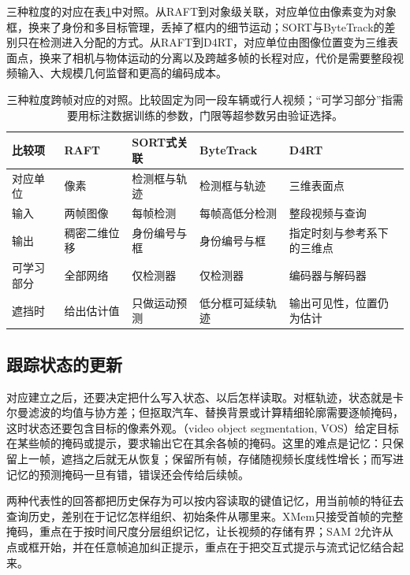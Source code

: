 三种粒度的对应在表\ref{tab:vision-video-correspondence-compare}中对照。从RAFT到对象级关联，对应单位由像素变为对象框，换来了身份和多目标管理，丢掉了框内的细节运动；SORT与ByteTrack的差别只在检测进入分配的方式。从RAFT到D4RT，对应单位由图像位置变为三维表面点，换来了相机与物体运动的分离以及跨越多帧的长程对应，代价是需要整段视频输入、大规模几何监督和更高的编码成本。

\begin{table}[htbp]
  \centering
  \small
  \begin{tabularx}{\linewidth}{@{}lXXXX@{}}
    \toprule
    比较项 & RAFT & SORT式关联 & ByteTrack & D4RT\\
    \midrule
    对应单位 & 像素 & 检测框与轨迹 & 检测框与轨迹 & 三维表面点\\
    输入 & 两帧图像 & 每帧检测 & 每帧高低分检测 & 整段视频与查询\\
    输出 & 稠密二维位移 & 身份编号与框 & 身份编号与框 & 指定时刻与参考系下的三维点\\
    可学习部分 & 全部网络 & 仅检测器 & 仅检测器 & 编码器与解码器\\
    遮挡时 & 给出估计值 & 只做运动预测 & 低分框可延续轨迹 & 输出可见性，位置仍为估计\\
    \bottomrule
  \end{tabularx}
  \caption{三种粒度跨帧对应的对照。比较固定为同一段车辆或行人视频；“可学习部分”指需要用标注数据训练的参数，门限等超参数另由验证选择。}
  \label{tab:vision-video-correspondence-compare}
\end{table}

\subsection{跟踪状态的更新}
\label{sec:vision-video-state-update}

对应建立之后，还要决定把什么写入状态、以后怎样读取。对框轨迹，状态就是卡尔曼滤波的均值与协方差；但抠取汽车、替换背景或计算精细轮廓需要逐帧掩码，这时状态还要包含目标的像素外观。（video object segmentation, VOS）给定目标在某些帧的掩码或提示，要求输出它在其余各帧的掩码。这里的难点是记忆：只保留上一帧，遮挡之后就无从恢复；保留所有帧，存储随视频长度线性增长；而写进记忆的预测掩码一旦有错，错误还会传给后续帧。

两种代表性的回答都把历史保存为可以按内容读取的键值记忆，用当前帧的特征去查询历史，差别在于记忆怎样组织、初始条件从哪里来。XMem只接受首帧的完整掩码，重点在于按时间尺度分层组织记忆，让长视频的存储有界；SAM 2允许从点或框开始，并在任意帧追加纠正提示，重点在于把交互式提示与流式记忆结合起来。

